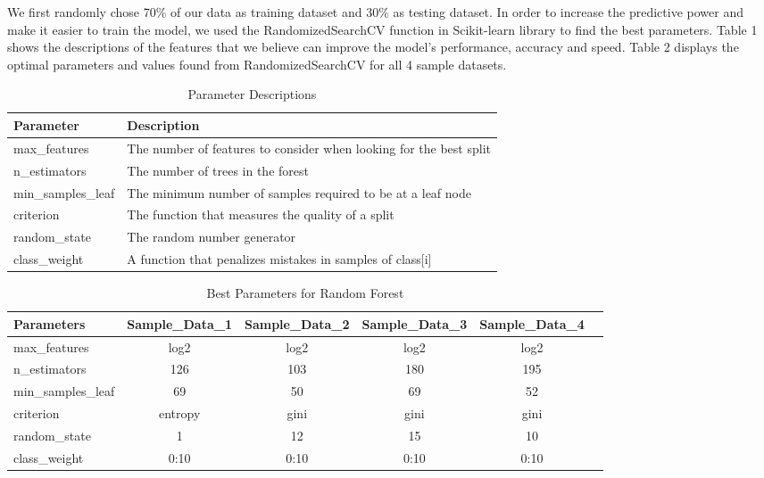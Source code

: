 \documentclass[a4paper, 12pt]{report}
\begin{document}
\noindent We first randomly chose 70\% of our data as training dataset and 30\% as testing dataset. In order to increase the predictive power and make it easier to train the model, we used the RandomizedSearchCV function in Scikit-learn library to find the best parameters. Table 1 shows the descriptions of the features that we believe can improve the model's performance, accuracy and speed. Table 2 displays the optimal parameters and values found from RandomizedSearchCV for all 4 sample datasets.

\begin{table}[h!]
	\caption{Parameter Descriptions}
	\begin{tabular}{ | l | p{12cm} |}
		\hline
		Parameter & Description  \\
		\hline
		max\_features & The number of features to consider when looking for the best split \\ 
		\hline
		n\_estimators & The number of trees in the forest \\ 
		\hline
		min\_samples\_leaf & The minimum number of samples required to be at a leaf node \\
		\hline
		criterion & The function that measures the quality of a split  \\
		\hline
		random\_state & The random number generator \\ 
		\hline
		class\_weight & A function that  penalizes mistakes in samples of class[i] \\ 
		\hline
	\end{tabular}
\end{table}

\begin{table}[h!]
	\caption{Best Parameters for Random Forest}
	\begin{tabular}{l*{4}{c}r}
		\hline
		Parameters     & Sample\_Data\_1 & Sample\_Data\_2 & Sample\_Data\_3 & Sample\_Data\_4 \\
		\hline
		max\_features & log2 & log2 & log2 & log2  \\
		n\_estimators & 126 & 103 & 180 & 195  \\
		min\_samples\_leaf & 69 & 50 & 69 & 52  \\
		criterion & entropy & gini & gini & gini  \\
		random\_state & 1 & 12 & 15 & 10  \\
		class\_weight & {0:10} & {0:10} & {0:10} & {0:10}  \\
		\hline
	\end{tabular}
\end{table}
\end{document}
